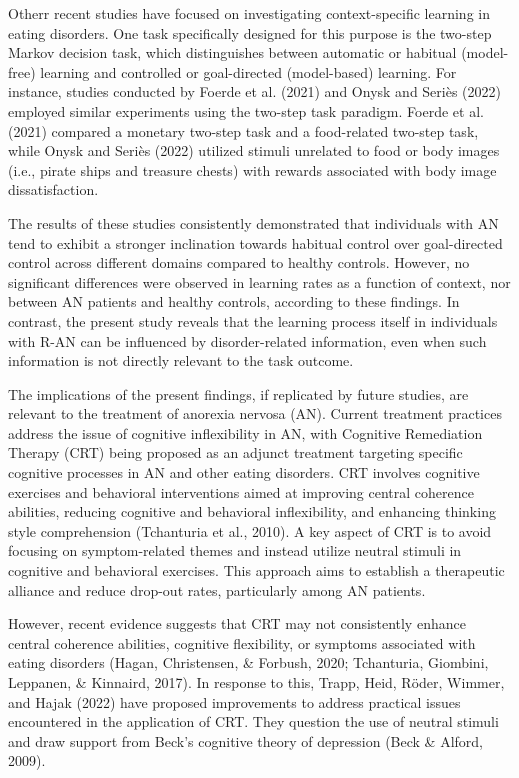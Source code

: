 \documentclass[
  man,floatsintext]{apa6}
\begin{document}
Otherr recent studies have focused on investigating context-specific learning in eating disorders. One task specifically designed for this purpose is the two-step Markov decision task, which distinguishes between automatic or habitual (model-free) learning and controlled or goal-directed (model-based) learning. For instance, studies conducted by Foerde et al. (2021) and Onysk and Seriès (2022) employed similar experiments using the two-step task paradigm. Foerde et al. (2021) compared a monetary two-step task and a food-related two-step task, while Onysk and Seriès (2022) utilized stimuli unrelated to food or body images (i.e., pirate ships and treasure chests) with rewards associated with body image dissatisfaction.

The results of these studies consistently demonstrated that individuals with AN tend to exhibit a stronger inclination towards habitual control over goal-directed control across different domains compared to healthy controls. However, no significant differences were observed in learning rates as a function of context, nor between AN patients and healthy controls, according to these findings. In contrast, the present study reveals that the learning process itself in individuals with R-AN can be influenced by disorder-related information, even when such information is not directly relevant to the task outcome.

The implications of the present findings, if replicated by future studies, are relevant to the treatment of anorexia nervosa (AN). Current treatment practices address the issue of cognitive inflexibility in AN, with Cognitive Remediation Therapy (CRT) being proposed as an adjunct treatment targeting specific cognitive processes in AN and other eating disorders. CRT involves cognitive exercises and behavioral interventions aimed at improving central coherence abilities, reducing cognitive and behavioral inflexibility, and enhancing thinking style comprehension (Tchanturia et al., 2010). A key aspect of CRT is to avoid focusing on symptom-related themes and instead utilize neutral stimuli in cognitive and behavioral exercises. This approach aims to establish a therapeutic alliance and reduce drop-out rates, particularly among AN patients.

However, recent evidence suggests that CRT may not consistently enhance central coherence abilities, cognitive flexibility, or symptoms associated with eating disorders (Hagan, Christensen, \& Forbush, 2020; Tchanturia, Giombini, Leppanen, \& Kinnaird, 2017). In response to this, Trapp, Heid, Röder, Wimmer, and Hajak (2022) have proposed improvements to address practical issues encountered in the application of CRT. They question the use of neutral stimuli and draw support from Beck's cognitive theory of depression (Beck \& Alford, 2009).
\end{document}
